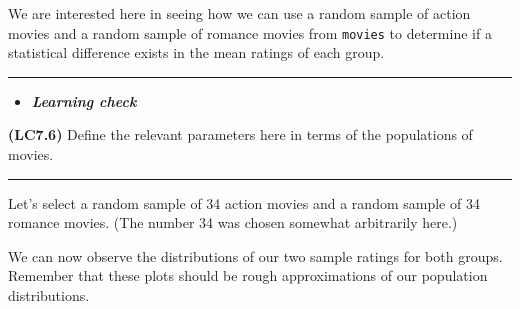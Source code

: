 \documentclass[]{tufte-book}
\newenvironment{Shaded}{\begin{snugshade}}{\end{snugshade}}
\newcommand{\KeywordTok}[1]{\textcolor[rgb]{0.13,0.29,0.53}{\textbf{{#1}}}}
\newcommand{\DataTypeTok}[1]{\textcolor[rgb]{0.13,0.29,0.53}{{#1}}}
\newcommand{\DecValTok}[1]{\textcolor[rgb]{0.00,0.00,0.81}{{#1}}}
\newcommand{\StringTok}[1]{\textcolor[rgb]{0.31,0.60,0.02}{{#1}}}
\newcommand{\NormalTok}[1]{{#1}}
\newenvironment{rmdblock}[1]
  {\begin{shaded*}
  \begin{itemize}
  \renewcommand{\labelitemi}{
    \raisebox{-.7\height}[0pt][0pt]{
    }
  }
  \item
  }
  {
  \end{itemize}
  \end{shaded*}
  }
\newenvironment{learncheck}
  {\begin{rmdblock}{warning}}
  {\end{rmdblock}}
\begin{document}
We are interested here in seeing how we can use a random sample of
action movies and a random sample of romance movies from \texttt{movies}
to determine if a statistical difference exists in the mean ratings of
each group.

\begin{center}\rule{\linewidth}{\linethickness}\end{center}\begin{learncheck}
\textbf{\emph{Learning check}}
\end{learncheck}

\textbf{(LC7.6)} Define the relevant parameters here in terms of the
populations of movies.

\begin{center}\rule{\linewidth}{\linethickness}\end{center}

Let's select a random sample of 34 action movies and a random sample of
34 romance movies. (The number 34 was chosen somewhat arbitrarily here.)

\begin{Shaded}
\end{Shaded}

We can now observe the distributions of our two sample ratings for both
groups. Remember that these plots should be rough approximations of our
population distributions.

\begin{Shaded}
\end{Shaded}
\end{document}
